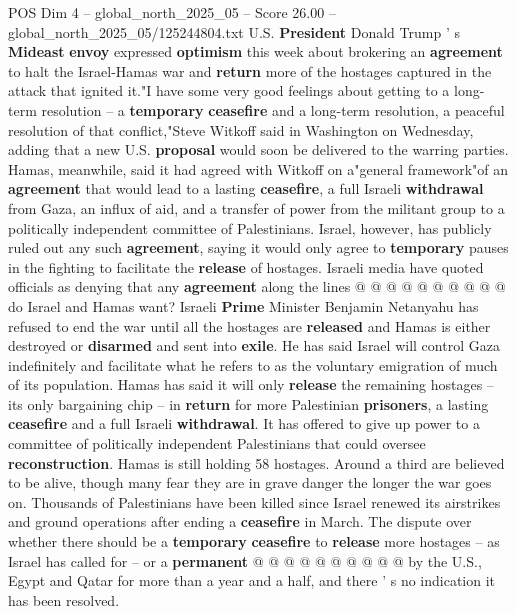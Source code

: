 \begin{textsample}{POS Dim 4 – global\_north\_2025\_05 – Score 26.00 – global\_north\_2025\_05/125244804.txt}  \label{ex:f4_pos_193}
U.S. \textbf{President} Donald Trump ' s \textbf{Mideast} \textbf{envoy} expressed \textbf{optimism} this week about brokering an \textbf{agreement} to halt the Israel-Hamas war and \textbf{return} more of the hostages captured in the attack that ignited it."I have some very good feelings about getting to a long-term resolution -- a \textbf{temporary} \textbf{ceasefire} and a long-term resolution, a peaceful resolution of that conflict,"Steve Witkoff said in Washington on Wednesday, adding that a new U.S. \textbf{proposal} would soon be delivered to the warring parties.
Hamas, meanwhile, said it had agreed with Witkoff on a"general framework"of an \textbf{agreement} that would lead to a lasting \textbf{ceasefire}, a full Israeli \textbf{withdrawal} from Gaza, an influx of aid, and a transfer of power from the militant group to a politically independent committee of Palestinians.
Israel, however, has publicly ruled out any such \textbf{agreement}, saying it would only agree to \textbf{temporary} pauses in the fighting to facilitate the \textbf{release} of hostages.
Israeli media have quoted officials as denying that any \textbf{agreement} along the lines @ @ @ @ @ @ @ @ @ @ do Israel and Hamas want?
Israeli \textbf{Prime} Minister Benjamin Netanyahu has refused to end the war until all the hostages are \textbf{released} and Hamas is either destroyed or \textbf{disarmed} and sent into \textbf{exile}.
He has said Israel will control Gaza indefinitely and facilitate what he refers to as the voluntary emigration of much of its population.
Hamas has said it will only \textbf{release} the remaining hostages -- its only bargaining chip -- in \textbf{return} for more Palestinian \textbf{prisoners}, a lasting \textbf{ceasefire} and a full Israeli \textbf{withdrawal}.
It has offered to give up power to a committee of politically independent Palestinians that could oversee \textbf{reconstruction}.
Hamas is still holding 58 hostages.
Around a third are believed to be alive, though many fear they are in grave danger the longer the war goes on.
Thousands of Palestinians have been killed since Israel renewed its airstrikes and ground operations after ending a \textbf{ceasefire} in March.
The dispute over whether there should be a \textbf{temporary} \textbf{ceasefire} to \textbf{release} more hostages -- as Israel has called for -- or a \textbf{permanent} @ @ @ @ @ @ @ @ @ @ by the U.S., Egypt and Qatar for more than a year and a half, and there ' s no indication it has been resolved.

\end{textsample}
